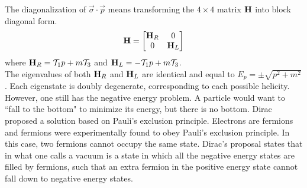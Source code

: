 \documentclass[12pt,a4paper,titlepage]{article}
\newcommand{\Tau}{\mathcal{T}} %
\begin{document}
The diagonalization of $\vec{\sigma}\cdot\vec{p}$ means transforming the $4\times 4$ matrix $\vb{H}$ into block diagonal form.
\begin{equation}
\vb{H}=\mqty[\vb{H}_{R} & 0 \\ 0 & \vb{H}_{L}]
\end{equation}
where $\vb{H}_{R}=\Tau_{1}p+m\Tau_{3}$ and $\vb{H}_{L}=-\Tau_{1}p+m\Tau_{3}$.\\

The eigenvalues of both $\vb{H}_{R}$ and $\vb{H}_{L}$ are identical and equal to $E_{p}=\pm\sqrt{p^{2}+m^{2}}$. Each eigenstate is doubly degenerate, corresponding to each possible helicity. However, one still has the negative energy problem. A particle would want to ``fall to the bottom" to minimize its energy, but there is no bottom. Dirac proposed a solution based on Pauli's exclusion principle. Electrons are fermions and fermions were experimentally found to obey Pauli's exclusion principle. In this case, two fermions cannot occupy the same state. Dirac's proposal states that in what one calls a vacuum is a state in which all the negative energy states are filled by fermions, such that an extra fermion in the positive energy state cannot fall down to negative energy states.
\begin{center}
\end{center}
\end{document}
